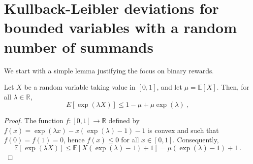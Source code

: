 \documentclass[wcp]{jmlr}
\newcommand{\E}{\mathbb{E}}
\newcommand{\R}{\mathbb{R}}
\newcommand{\1}{\mathbbm{1}}
\begin{document}
{\appendix
\section{Kullback-Leibler deviations for bounded variables with a random number of summands}\label{sec:appendix}
We start with a simple lemma justifying the focus on binary rewards.
\begin{lemma}\label{lem:bounded2bernoulli}
  Let $X$ be a random variable taking value in $[0,1]$, and let $\mu =
  \E[X]$. Then, for all $\lambda \in \R$, \[E\left[ \exp(\lambda X) \right]
  \leq 1-\mu +\mu\exp(\lambda) \;,\]

\end{lemma}
\begin{proof}
  The function $f:[0,1]\to\R$ defined by
  $f(x) = \exp(\lambda x)-x\left(\exp(\lambda)-1\right) - 1$ is convex and such that $f(0)=f(1)=0$, hence $f(x)\leq 0$ for all
  $x\in[0,1]$.  Consequently,
  \[\E\left[ \exp(\lambda X) \right] \leq \E\left[
    X\left(\exp(\lambda)-1\right) +1 \right] = \mu(\exp(\lambda)-1) +1\;.\]
\end{proof}

}
\end{document}
